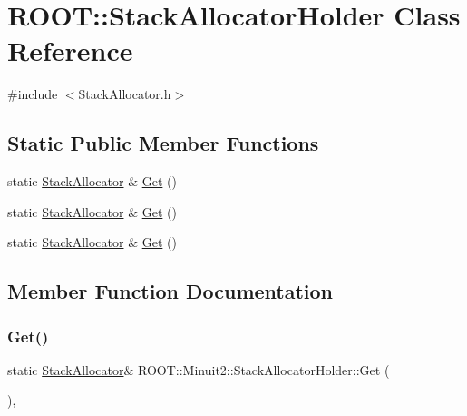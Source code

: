 \hypertarget{classROOT_1_1Minuit2_1_1StackAllocatorHolder}{}\section{R\+O\+OT\+:\+:Stack\+Allocator\+Holder Class Reference}
\label{classROOT_1_1Minuit2_1_1StackAllocatorHolder}


{\ttfamily \#include $<$Stack\+Allocator.\+h$>$}

\subsection*{Static Public Member Functions}
\begin{DoxyCompactItemize}
\item 
static \mbox{\hyperlink{classROOT_1_1Minuit2_1_1StackAllocator}{Stack\+Allocator}} \& \mbox{\hyperlink{classROOT_1_1Minuit2_1_1StackAllocatorHolder_ae380b3ed5065e114b12ac61207542466}{Get}} ()
\item 
static \mbox{\hyperlink{classROOT_1_1Minuit2_1_1StackAllocator}{Stack\+Allocator}} \& \mbox{\hyperlink{classROOT_1_1Minuit2_1_1StackAllocatorHolder_ae380b3ed5065e114b12ac61207542466}{Get}} ()
\item 
static \mbox{\hyperlink{classROOT_1_1Minuit2_1_1StackAllocator}{Stack\+Allocator}} \& \mbox{\hyperlink{classROOT_1_1Minuit2_1_1StackAllocatorHolder_ae380b3ed5065e114b12ac61207542466}{Get}} ()
\end{DoxyCompactItemize}


\subsection{Member Function Documentation}
\mbox{\label{classROOT_1_1Minuit2_1_1StackAllocatorHolder_ae380b3ed5065e114b12ac61207542466}} 
\subsubsection{\texorpdfstring{Get()}{Get()}\hspace{0.1cm}{\footnotesize\ttfamily [1/3]}}
{\footnotesize\ttfamily static \mbox{\hyperlink{classROOT_1_1Minuit2_1_1StackAllocator}{Stack\+Allocator}}\& R\+O\+O\+T\+::\+Minuit2\+::\+Stack\+Allocator\+Holder\+::\+Get (\begin{DoxyParamCaption}{ }\end{DoxyParamCaption})\hspace{0.3cm}{\ttfamily [inline]}, {\ttfamily [static]}}

